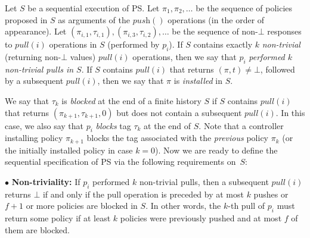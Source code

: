\documentclass[11pt,pdftex,letter]{article}
\newcommand{\PS}{\textsc{PS}}
\newcommand{\ssnote}[1]{\textcolor{heraldBlue}{\small \bf [SS: #1]}}
\newcommand{\ssnote}[1]{}
\begin{document}
%
Let $S$ be a sequential execution of {\PS}.
Let $\pi_1,\pi_2,\ldots$ be the sequence of policies proposed in $S$
as arguments of the $\textit{push}()$ operations (in the order of appearance).
Let $(\pi_{i,1},\tau_{i,1}),(\pi_{i,3},\tau_{i,2}),\ldots$
be the sequence of non-$\bot$ responses to $\textit{pull}(i)$
operations in $S$ (performed by $p_i$).
%
If $S$ contains exactly $k$ \emph{non-trivial} (returning non-$\bot$ values)
$\textit{pull}(i)$ operations, then we say that $p_i$ \emph{performed $k$
non-trivial pulls in $S$}.
If $S$ contains $\textit{pull}(i)$ that returns $(\pi,t)\neq\bot$,
followed by a subsequent $\textit{pull}(i)$, then we
say that $\pi$ is \emph{installed} in $S$. %

We say that $\tau_k$ is \emph{blocked} at the end of a finite history $S$
if $S$ contains $\textit{pull}(i)$ that
returns $(\pi_{k+1},\tau_{k+1}, 0)$ but does not contain a subsequent
$\textit{pull}(i)$.
In this case, we also say that $p_i$ \emph{blocks} tag $\tau_{k}$ at the
end of $S$.
Note that a controller installing policy $\pi_{k+1}$ blocks the tag associated
with the \emph{previous} policy $\pi_{k}$ (or the initially installed policy
in case $k=0$).
Now we are ready to define the sequential specification of {\PS}
via the following requirements on~$S$:

\vspace{1.5mm}
\noindent $\bullet$ \textbf{Non-triviality:}
If $p_i$ performed $k$ non-trivial pulls, then
a subsequent $\textit{pull}(i)$ returns $\bot$ if and only if
the pull operation  is preceded by at most $k$ pushes or  $f+1$ or more
policies are blocked in $S$.
In other words, the $k$-th pull of $p_i$ must return some
policy if at least $k$ policies were previously pushed and at most $f$
of them are blocked.
\end{document}
